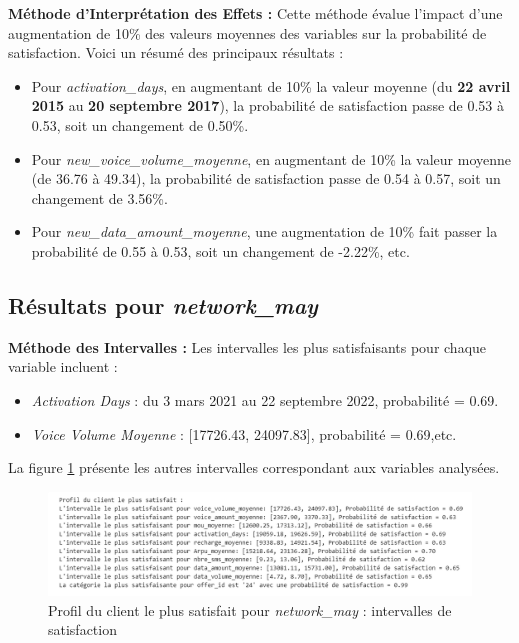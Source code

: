 \textbf{Méthode d'Interprétation des Effets :}
Cette méthode évalue l'impact d'une augmentation de 10\% des valeurs moyennes des variables sur la probabilité de satisfaction. Voici un résumé des principaux résultats :

\begin{itemize}
    \item Pour \textit{activation\_days}, en augmentant de 10\% la valeur moyenne (du \textbf{22 avril 2015} au \textbf{20 septembre 2017}), la probabilité de satisfaction passe de 0.53 à 0.53, soit un changement de 0.50\%.
    \item Pour \textit{new\_voice\_volume\_moyenne}, en augmentant de 10\% la valeur moyenne (de 36.76 à 49.34), la probabilité de satisfaction passe de 0.54 à 0.57, soit un changement de 3.56\%.
    \item Pour \textit{new\_data\_amount\_moyenne}, une augmentation de 10\% fait passer la probabilité de 0.55 à 0.53, soit un changement de -2.22\%, etc.
\end{itemize}

\subsection{Résultats pour \textit{network\_may}}

\textbf{Méthode des Intervalles :}
Les intervalles les plus satisfaisants pour chaque variable incluent :
\begin{itemize}
    \item \textit{Activation Days} : du 3 mars 2021 au 22 septembre 2022, probabilité = 0.69.
    \item \textit{Voice Volume Moyenne} : [17726.43, 24097.83], probabilité = 0.69,etc.
\end{itemize}
La figure \ref{fig:profil_satisfait_may} présente les autres intervalles correspondant aux variables analysées.
\begin{figure}[H]
    \centering
    \includegraphics[width=0.9\linewidth]{capture_modele_33.png}
    \caption{Profil du client le plus satisfait pour \textit{network\_may} : intervalles de satisfaction}
    \label{fig:profil_satisfait_may}
\end{figure}

